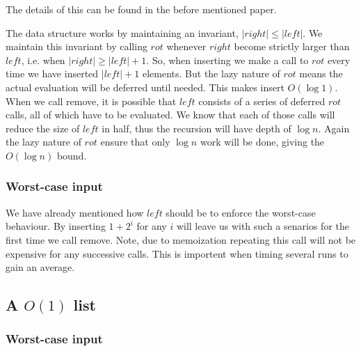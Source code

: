 The details of this can be found in the before mentioned paper.

The data structure works by maintaining an invariant, $|right| \leq |left|$. We maintain this invariant by calling $rot$ whenever $right$ become strictly larger than $left$, i.e. when $|right| \geq |left| + 1$. So, when inserting we make a call to $rot$ every time we have inserted $|left| +1$ elements. But the lazy nature of $rot$ means the actual evaluation will be deferred until needed. This makes insert $O(\log 1)$. When we call remove, it is possible that $left$ consists of a series of deferred $rot$ calls, all of which have to be evaluated. We know that each of those calls will reduce the size of $left$ in half, thus the recursion will have depth of $\log n$. Again the lazy nature of $rot$ ensure that only $\log n$ work will be done, giving the $O(\log n)$ bound.

\subsubsection{Worst-case input}
We have already mentioned how $left$ should be to enforce the worst-case behaviour. By inserting $1 + 2^i$ for any $i$ will leave us with such a senarios for the first time we call remove. Note, due to memoization repeating this call will not be expensive for any successive calls. This is importent when timing several runs to gain an average.

\subsection*{A $O(1)$ list}

\subsubsection{Worst-case input}